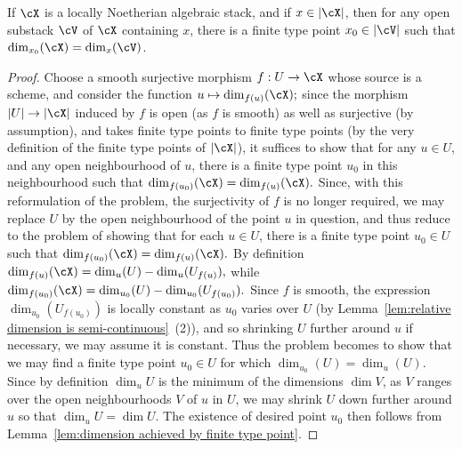 \begin{alemma}
If $\cX$ is a locally Noetherian algebraic stack, and if $x \in |\cX|$, then
for any open substack $\cV$ of $\cX$ containing $x$,
there is a finite type point $x_0 \in |\cV|$ such that
$\dim_{x_0}(\cX) = \dim_x(\cV)$.
\end{alemma}
\begin{proof}
Choose a smooth surjective
morphism  $f:U \to \cX$ whose source is a scheme, and consider the
function $u \mapsto \dim_{f(u)}(\cX);$
since the morphism $|U| \to |\cX|$ induced by $f$ is open (as $f$ 
is smooth) as well as  surjective (by assumption),
and takes finite type points to finite type points (by the very definition
of the finite type points of $|\cX|$), 
it suffices to show that for any $u \in U$, and any open neighbourhood of $u$,
there is a finite type point $u_0$ in this neighbourhood such that
$\dim_{f(u_0)}(\cX) = \dim_{f(u)}(\cX).$ 
Since, with this reformulation
of the problem,  the surjectivity of $f$ is no longer required, 
we may replace $U$ by the open neighbourhood of the point $u$ in question,
and thus reduce to the problem of showing that for each $u \in U$,
there is a finite type point $u_0 \in U$ such that
$\dim_{f(u_0)}(\cX) = \dim_{f(u)}(\cX).$ 
By definition
$\dim_{f(u)}(\cX) = \dim_u(U) - \dim_u(U_{f(u)}),$
while 
$\dim_{f(u_0)}(\cX) = \dim_{u_0}(U) - \dim_{u_0}(U_{f(u_0)}).$
Since $f$ is smooth, the expression $\dim_{u_0}(U_{f(u_0)})$ is locally
constant as $u_0$ varies over $U$ (by Lemma~\ref{lem:relative dimension 
is semi-continuous}~(2)), and so shrinking $U$ further around
$u$ if necessary, we may assume it is constant.  Thus the problem
becomes to show that we may find a finite type point $u_0 \in U$
for which $\dim_{u_0}(U) = \dim_u(U)$. 
Since by definition $\dim_u U$ is the minimum of the dimensions
$\dim V$, as $V$ ranges over the open neighbourhoods $V$ of $u$
in $U$, we may shrink $U$ down further around $u$ so that
$\dim_u U = \dim U$.
The existence of desired point $u_0$ then follows from
Lemma~\ref{lem:dimension achieved by finite type point}. 
\end{proof}



